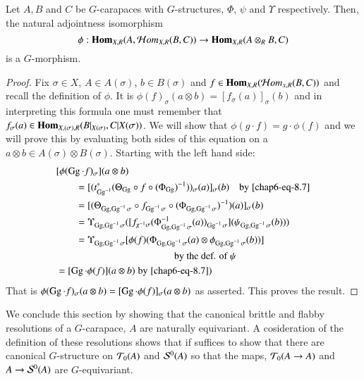 \setcounter{definition}{8}
\begin{secprop}\label{chap6-proposition-8.9}
Let $A, B$ and $C$ be $G$-carapaces with $G$-structures, $\Phi$, $\psi$ and $\Upsilon$ respectively. Then, the natural adjointness isomorphism
$$
\phi : \operatorname{\mathbf{Hom}}_{X, R}(A, \mathcal{H} om_{X, R}(B, C)) \rightarrow \operatorname{\mathbf{Hom}}_{X, R}(A\otimes_{R}B, C)
$$
is a $G$-morphism. 
\end{secprop}

\begin{proof}
Fix $\sigma \in X$, $A \in A(\sigma)$, $b \in B(\sigma)$ and $f \in \operatorname{\mathbf{Hom}}_{X, R}(\mathcal{H} om_{x, R}(B, C))$ and recall the definition of $\phi$. It is $\phi(f)_{\sigma}(a\otimes b) =\left[f_{\sigma}(a)\right]_{\sigma}(b)$ and in interpreting this formula one must remember that $f_{\sigma}(a) \in \bHom_{X, (\sigma), R}\break (B|_{X(\sigma)}, C|X(\sigma))$. We will show that $\phi({g} \cdot f) = {g} \cdot \phi(f)$ and we will prove this by evaluating both sides of this equation on a $a\otimes b \in A(\sigma) \otimes B(\sigma)$. Starting with the left hand side:
\begin{align*}
& [\phi(\operatorname{Gg} \cdot f)_{\sigma}](a\otimes b) \\
&\qquad = [(t_{\operatorname{Gg}^{-1}}^{*}(\Theta_{\operatorname{Gg}} \circ f \circ (\Phi_{\operatorname{Gg}})^{-1}))_{\sigma}(a)]_{\sigma}(b) \quad \text{by} \;\ref{chap6-eq-8.7}\\
&\qquad = [(\Theta_{\operatorname{Gg}, \operatorname{Gg}^{-1} \sigma} \circ f_{\operatorname{Gg}^{-1}\sigma} \circ (\Phi_{\operatorname{Gg}, \operatorname{Gg}^{-1}\sigma})^{-1})(a)]_{\sigma}(b)\\
&\qquad = \Upsilon_{\operatorname{Gg}, \operatorname{Gg}^{-1}\sigma}([f_{g^{-1}\sigma}(\Phi_{\operatorname{Gg}, \operatorname{Gg}^{-1}\sigma}^{-1}(a))_{\operatorname{Gg}^{-1}\sigma}](\psi_{\operatorname{Gg}, \operatorname{Gg}^{-1}\sigma}(b)))\\
&\qquad = \Upsilon_{\operatorname{Gg}, \operatorname{Gg}^{-1}\sigma}[\phi(f)(\Phi_{\operatorname{Gg}, \operatorname{Gg}^{-1}\sigma}(a)\otimes \phi_{\operatorname{Gg}, \operatorname{Gg}^{-1}\sigma}(b))] \\
&\qquad \qquad \qquad \qquad \qquad \qquad \text{by the def. of}\; \psi\\
& =[\operatorname{Gg} \cdot \phi (f)](a \otimes b) \; \text{by} \;\ref{chap6-eq-8.7})
\end{align*}
That is $\phi(\operatorname{Gg} \cdot f)_{\sigma}(a\otimes b) = [\operatorname{Gg} \cdot \phi(f)]_{\sigma}(a \otimes b)$ as asserted. This proves the result.
\end{proof}

We conclude this section by showing that the canonical brittle and flabby resolutions of a $G$-carapace, $A$ are naturally equivariant. A cosideration of the definition of these resolutions shows that if suffices to show that there are canonical $G$-structure on $\mathcal{T}_{0}(A)$ and $\mathcal{S}^{0}(A)$ so that the maps, $\mathcal{T}_{0}(A \rightarrow A)$ and $A \rightarrow \mathcal{S}^{0}(A)$ are $G$-equivariant.

